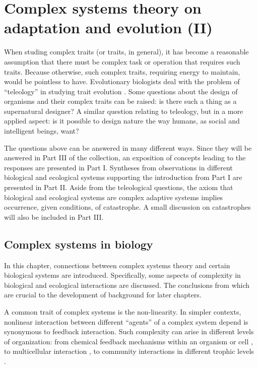 \chapter{Complex systems theory on adaptation and evolution (II)}

When studing complex traits (or traits, in general), it has become a reasonable assumption that there must be complex task or operation that requires such traits.
Because otherwise, such complex traits, requiring energy to maintain, would be pointless to have.
Evolutionary biologists deal with the problem of ``teleology'' in studying trait evolution \cite{Veloso2019}.
Some questions about the design of organisms and their complex traits can be raised: is there such a thing as a supernatural designer?
A similar question relating to teleology, but in a more applied aspect: is it possible to design nature the way humans, as social and intelligent beings, want?

The questions above can be answered in many different ways.
Since they will be answered in Part III of the collection, an exposition of concepts leading to the responses are presented in Part I.
Syntheses from observations in different biological and ecological systems supporting the introduction from Part I are presented in Part II.
Aside from the teleological questions, the axiom that biological and ecological systems are complex adaptive systems \cite{Dong2019} implies occurrence, given conditions, of catastrophe.
A small discussion on catastrophes will also be included in Part III.

\section{Complex systems in biology}

In this chapter, connections between complex systems theory and certain biological systems are introduced.
Specifically, some aspects of complexity in biological and ecological interactions are discussed.
The conclusions from which are crucial to the development of background for later chapters.

A common trait of complex systems is the non-linearity. %
In simpler contexts, nonlinear interaction between different ``agents'' of a complex system depend is synonymous to feedback interaction.
Such complexity can arise in different levels of organization: from chemical feedback mechanisms within an organism or cell \cite{Chaves2019}, to multicellular interaction \cite{Veloso2017}, to community interactions in different trophic levels \cite{Seibold2018}.

